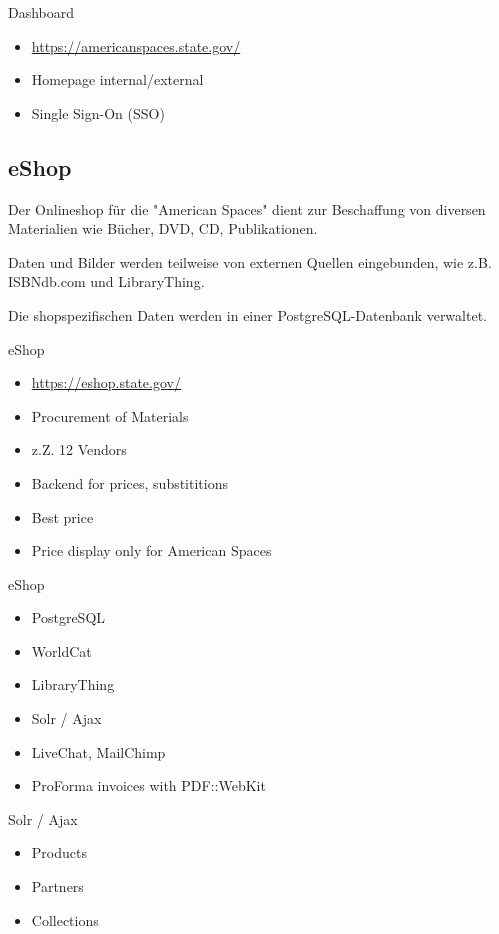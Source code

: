 \begin{frame}{Dashboard}
\begin{itemize}
\item \url{https://americanspaces.state.gov/}
\item Homepage internal/external
\item Single Sign-On (SSO)
\end{itemize}
\end{frame}
    
\subsection{eShop}

Der Onlineshop für die "American Spaces" dient zur Beschaffung von
diversen Materialien wie Bücher, DVD, CD, Publikationen.

Daten und Bilder werden teilweise von externen Quellen eingebunden,
wie z.B. ISBNdb.com und LibraryThing.

Die shopspezifischen Daten werden in einer PostgreSQL-Datenbank
verwaltet.

\begin{frame}{eShop}
\begin{itemize}
\item \url{https://eshop.state.gov/}
\item Procurement of Materials
\item z.Z. 12 Vendors
\item Backend for prices, substititions
\item Best price
\item Price display only for American Spaces
\end{itemize}
\end{frame}

\begin{frame}{eShop}
\begin{itemize}
\item PostgreSQL
\item WorldCat
\item LibraryThing
\item Solr / Ajax
\item LiveChat, MailChimp
\item ProForma invoices with PDF::WebKit
\end{itemize}
\end{frame}

\begin{frame}[fragile]{Solr / Ajax}
\begin{itemize}
\item Products
\item Partners
\item Collections
\end{itemize}
\end{frame}
    
